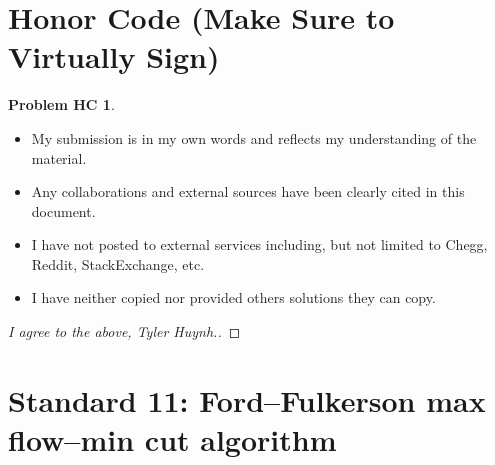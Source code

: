 \documentclass[11pt]{article}
\theoremstyle{definition}
\theoremstyle{definition}
\newtheorem*{requiredHC}{Problem HC}
\theoremstyle{definition}
\begin{document}
\newpage
\section*{Honor Code (Make Sure to Virtually Sign)} \label{HonorCode}
\hypertarget{HonorCode}{}

\begin{requiredHC}
\begin{itemize}
\item My submission is in my own words and reflects my understanding of the material.
\item Any collaborations and external sources have been clearly cited in this document.
\item I have not posted to external services including, but not limited to Chegg, Reddit, StackExchange, etc.
\item I have neither copied nor provided others solutions they can copy.
\end{itemize}

\end{requiredHC}

\begin{proof}[I agree to the above, Tyler Huynh.]
\end{proof}


\newpage
\setcounter{section}{10}
\section{Standard 11: Ford--Fulkerson max flow--min cut algorithm}
\end{document}
